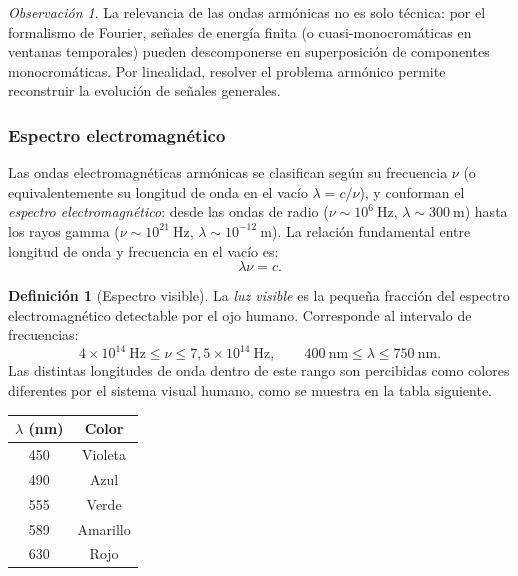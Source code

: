 \documentclass[12pt, a4paper]{article}
\theoremstyle{plain}
\theoremstyle{definition}
\newtheorem{definicion}[teorema]{Definición}
\theoremstyle{remark}
\newtheorem*{observacion}{Observación}
\begin{document}
\begin{observacion}
La relevancia de las ondas armónicas no es solo técnica: por el formalismo de
Fourier, señales de energía finita (o cuasi-monocromáticas en ventanas
temporales) pueden descomponerse en superposición de componentes
monocromáticas. Por linealidad, resolver el problema armónico
permite reconstruir la evolución de señales generales.
\end{observacion}

\subsubsection{Espectro electromagnético}

Las ondas electromagnéticas armónicas se clasifican según su frecuencia $\nu$
(o equivalentemente su longitud de onda en el vacío $\lambda = c/\nu$), y
conforman el \emph{espectro electromagnético}: desde las ondas de radio
($\nu \sim 10^6\ \mathrm{Hz}$, $\lambda \sim 300\ \mathrm{m}$) hasta los
rayos gamma ($\nu \sim 10^{21}\ \mathrm{Hz}$, $\lambda \sim 10^{-12}\ \mathrm{m}$).
La relación fundamental entre longitud de onda y frecuencia en el vacío es:
\[
  \lambda\nu = c.
\]

\begin{definicion}[Espectro visible]
La \emph{luz visible} es la pequeña fracción del espectro electromagnético
detectable por el ojo humano. Corresponde al intervalo de frecuencias:
\begin{equation}
  4\times10^{14}\ \mathrm{Hz} \leq \nu \leq 7{,}5\times10^{14}\ \mathrm{Hz},
  \qquad
  400\ \mathrm{nm} \leq \lambda \leq 750\ \mathrm{nm}. \label{eq:espectro}
\end{equation}
Las distintas longitudes de onda dentro de este rango son percibidas como
colores diferentes por el sistema visual humano, como se muestra en la
tabla siguiente.
\end{definicion}

\begin{center}
\begin{tabular}{@{}cc@{}}
  \toprule
  $\lambda$ (nm) & Color \\
  \midrule
  450 & Violeta \\
  490 & Azul    \\
  555 & Verde   \\
  589 & Amarillo \\
  630 & Rojo    \\
  \bottomrule
\end{tabular}
\end{center}
\end{document}
